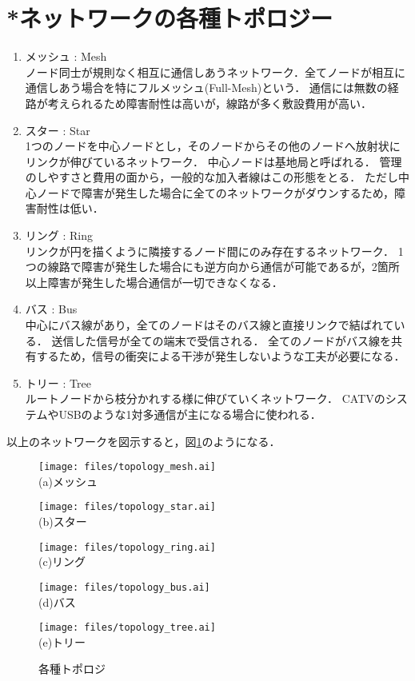 \documentclass[10.5pt]{jsarticle}
\begin{document}
\section{*ネットワークの各種トポロジー}
\begin{enumerate}
\item{メッシュ : Mesh}\\
ノード同士が規則なく相互に通信しあうネットワーク．全てノードが相互に通信しあう場合を特にフルメッシュ(Full-Mesh)という．
通信には無数の経路が考えられるため障害耐性は高いが，線路が多く敷設費用が高い．
\item{スター : Star}\\
1つのノードを中心ノードとし，そのノードからその他のノードへ放射状にリンクが伸びているネットワーク．
中心ノードは基地局と呼ばれる．
管理のしやすさと費用の面から，一般的な加入者線はこの形態をとる．
ただし中心ノードで障害が発生した場合に全てのネットワークがダウンするため，障害耐性は低い．
\item{リング : Ring}\\
リンクが円を描くように隣接するノード間にのみ存在するネットワーク．
1つの線路で障害が発生した場合にも逆方向から通信が可能であるが，2箇所以上障害が発生した場合通信が一切できなくなる．
\item{バス : Bus}\\
中心にバス線があり，全てのノードはそのバス線と直接リンクで結ばれている．
送信した信号が全ての端末で受信される．
全てのノードがバス線を共有するため，信号の衝突による干渉が発生しないような工夫が必要になる．
\item{トリー : Tree}\\
ルートノードから枝分かれする様に伸びていくネットワーク．
CATVのシステムやUSBのような1対多通信が主になる場合に使われる．
\end{enumerate}
以上のネットワークを図示すると，図\ref{topology}のようになる．
\begin{figure}[h]
	\centering
	\begin{minipage}{0.25\hsize}
		\centering
		\texttt{[image: files/topology\_mesh.ai]}\\
		(a)メッシュ
	\end{minipage}
	\begin{minipage}{0.25\hsize}
		\centering
		\texttt{[image: files/topology\_star.ai]}\\
		(b)スター
	\end{minipage}
	\begin{minipage}{0.25\hsize}
		\centering
		\texttt{[image: files/topology\_ring.ai]}\\
		(c)リング
	\end{minipage}
	\begin{minipage}{0.35\hsize}
		\centering
		\texttt{[image: files/topology\_bus.ai]}\\
		(d)バス
	\end{minipage}
	\begin{minipage}{0.35\hsize}
		\centering
		\texttt{[image: files/topology\_tree.ai]}\\
		(e)トリー
	\end{minipage}
	\caption{各種トポロジ}\label{topology}
\end{figure}
\end{document}
